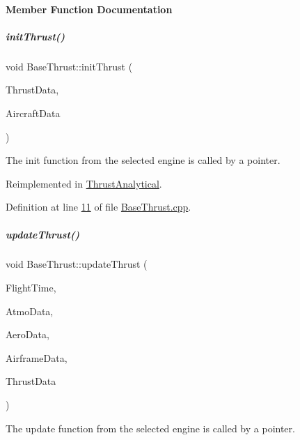 \paragraph{Member Function Documentation}
\mbox{\label{group___engine_a02b3fe7f763d84c5d34b59f124eaf455}} 
\subparagraph{\texorpdfstring{init\+Thrust()}{initThrust()}}
{\footnotesize\ttfamily void Base\+Thrust\+::init\+Thrust (\begin{DoxyParamCaption}\item[{Thrust\+Struct \&}]{Thrust\+Data,  }\item[{Aircraft\+Struct \&}]{Aircraft\+Data }\end{DoxyParamCaption})\hspace{0.3cm}{\ttfamily [virtual]}}

The init function from the selected engine is called by a pointer. 

Reimplemented in \hyperlink{group___engine_a5eb762aee5e5823fa34b2236d9b21134}{Thrust\+Analytical}.



Definition at line \hyperlink{_base_thrust_8cpp_source_l00011}{11} of file \hyperlink{_base_thrust_8cpp_source}{Base\+Thrust.\+cpp}.

\mbox{\label{group___engine_a869359a1b2b7cddcbe5979d6a1cf5eac}} 
\subparagraph{\texorpdfstring{update\+Thrust()}{updateThrust()}}
{\footnotesize\ttfamily void Base\+Thrust\+::update\+Thrust (\begin{DoxyParamCaption}\item[{\hyperlink{group___tools_ga3f1431cb9f76da10f59246d1d743dc2c}{Float64}}]{Flight\+Time,  }\item[{Atmosphere\+Struct \&}]{Atmo\+Data,  }\item[{Aerodynamic\+Struct \&}]{Aero\+Data,  }\item[{Airframe\+Struct \&}]{Airframe\+Data,  }\item[{Thrust\+Struct \&}]{Thrust\+Data }\end{DoxyParamCaption})\hspace{0.3cm}{\ttfamily [virtual]}}

The update function from the selected engine is called by a pointer. 

